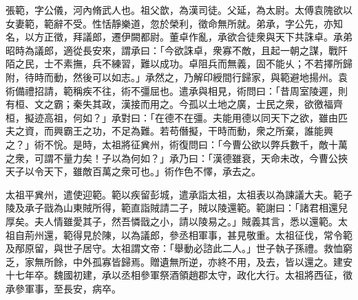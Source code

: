 \begin{pinyinscope}
 
 
 張範，字公儀，河內脩武人也。祖父歆，為漢司徒。父延，為太尉。太傅袁隗欲以女妻範，範辭不受。性恬靜樂道，忽於榮利，徵命無所就。弟承，字公先，亦知名，以方正徵，拜議郎，遷伊闕都尉。董卓作亂，承欲合徒衆與天下共誅卓。承弟昭時為議郎，適從長安來，謂承曰：「今欲誅卓，衆寡不敵，且起一朝之謀，戰阡陌之民，士不素撫，兵不練習，難以成功。卓阻兵而無義，固不能乆；不若擇所歸附，待時而動，然後可以如志。」承然之，乃解印綬間行歸家，與範避地揚州。袁術備禮招請，範稱疾不往，術不彊屈也。遣承與相見，術問曰：「昔周室陵遲，則有桓、文之霸；秦失其政，漢接而用之。今孤以土地之廣，士民之衆，欲徼福齊桓，擬迹高祖，何如？」承對曰：「在德不在彊。夫能用德以同天下之欲，雖由匹夫之資，而興霸王之功，不足為難。若苟僭擬，干時而動，衆之所棄，誰能興之？」術不恱。是時，太祖將征兾州，術復問曰：「今曹公欲以弊兵數千，敵十萬之衆，可謂不量力矣！子以為何如？」承乃曰：「漢德雖衰，天命未改，今曹公挾天子以令天下，雖敵百萬之衆可也。」術作色不懌，承去之。
 
 
 
 
 太祖平兾州，遣使迎範。範以疾留彭城，遣承詣太祖，太祖表以為諫議大夫。範子陵及承子戩為山東賊所得，範直詣賊請二子，賊以陵還範。範謝曰：「諸君相還兒厚矣。夫人情雖愛其子，然吾憐戩之小，請以陵易之。」賊義其言，悉以還範。太祖自荊州還，範得見於陳，以為議郎，參丞相軍事，甚見敬重。太祖征伐，常令範及邴原留，與世子居守。太祖謂文帝：「舉動必諮此二人。」世子執子孫禮。救恤窮乏，家無所餘，中外孤寡皆歸焉。贈遺無所逆，亦終不用，及去，皆以還之。建安十七年卒。魏國初建，承以丞相參軍祭酒領趙郡太守，政化大行。太祖將西征，徵承參軍事，至長安，病卒。
 
 
 
 
\end{pinyinscope}